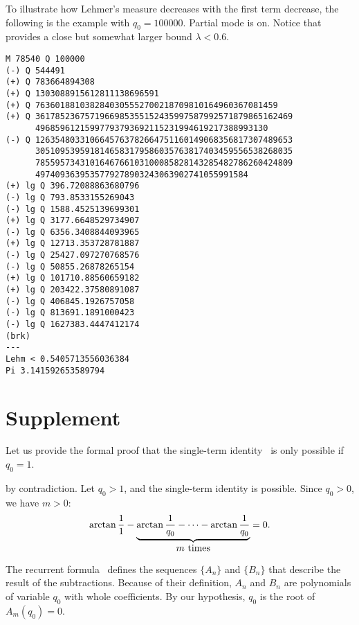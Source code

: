 \documentclass[draft, 10pt]{article} %
\def\fact#1{Fact~\ref{#1}}
\begin{document}
To illustrate how Lehmer's measure decreases with the first term decrease, the following is
the example with $q_0 = 100000$. Partial mode is on.
Notice that~ provides a close but
somewhat larger bound $\lambda < 0.6$.

\begin{verbatim}
M 78540 Q 100000
(-) Q 544491
(+) Q 783664894308
(+) Q 1303088915612811138696591
(+) Q 7636018810382840305552700218709810164960367081459
(+) Q 3617852367571966985355152435997587992571879865162469
      49685961215997793793692115231994619217388993130
(-) Q 1263548033106645763782664751160149068356817307489653
      3051095395918146583179586035763817403459556538268035
      7855957343101646766103100085828143285482786260424809
      4974093639535779278903243063902741055991584
(+) lg Q 396.72088863680796
(-) lg Q 793.8533155269043
(-) lg Q 1588.4525139699301
(+) lg Q 3177.6648529734907
(-) lg Q 6356.3408844093965
(+) lg Q 12713.353728781887
(-) lg Q 25427.097270768576
(-) lg Q 50855.26878265154
(+) lg Q 101710.88560659182
(+) lg Q 203422.37580891087
(-) lg Q 406845.1926757058
(-) lg Q 813691.1891000423
(-) lg Q 1627383.4447412174
(brk)
---
Lehm < 0.5405713556036384 
Pi 3.141592653589794
\end{verbatim}

\section{Supplement}

\noindent{\bf \fact{nosingle}.\/} Let us provide the formal proof that
the single-term identity~ is only possible if $q_0=1$.

 by contradiction. Let $q_0>1$, and the single-term identity is possible.
Since $q_0>0$, we have $m>0$:
$$
\arctan \dfrac{1}{1} - \underbrace{\arctan \dfrac{1}{q_0} - \dots - \arctan \dfrac{1}{q_0}}_{\hbox{$m$ times}} = 0.
$$

The recurrent formula~ defines the sequences $\{ A_n \}$ and $\{ B_n \}$ that
describe the result of the subtractions.
Because of their definition, $A_n$ and $B_n$ are polynomials of variable $q_0$
with whole coefficients. By our hypothesis, $q_0$ is the root of $A_m(q_0)=0$.
\end{document}
